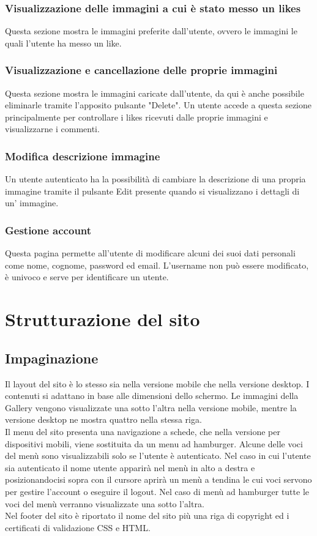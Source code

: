 \documentclass[openany, a4paper, 12pt]{report}
\begin{document}
		\subsubsection{Visualizzazione delle immagini a cui è stato messo un likes}
		Questa sezione mostra le immagini preferite dall'utente, ovvero le immagini le quali l'utente ha messo un like.
		
		\subsubsection{Visualizzazione e cancellazione delle proprie immagini}
		Questa sezione mostra le immagini caricate dall'utente, da qui è anche possibile eliminarle tramite l'apposito pulsante "Delete". Un utente accede a questa sezione principalmente per controllare i likes ricevuti dalle proprie immagini e visualizzarne i commenti.
		
		\subsubsection{Modifica descrizione immagine}
		Un utente autenticato ha la possibilità di cambiare la descrizione di una propria immagine tramite il pulsante Edit presente quando si visualizzano i dettagli di un' immagine.
			
		\subsubsection{Gestione account}
		Questa pagina permette all'utente di modificare alcuni dei suoi dati personali come nome, cognome, password ed email. L'username non può essere modificato, è univoco e serve per identificare un utente.

	\section{Strutturazione del sito}
		\subsection{Impaginazione}
		Il layout del sito è lo stesso sia nella versione mobile che nella versione desktop. I contenuti si adattano in base alle dimensioni dello schermo. Le immagini della Gallery vengono visualizzate una sotto l'altra nella versione mobile, mentre la versione desktop ne mostra quattro nella stessa riga.\\
		Il menu del sito presenta una navigazione a schede, che nella versione per dispositivi mobili, viene sostituita da un menu ad hamburger. Alcune delle voci del menù sono visualizzabili solo se l'utente è autenticato. Nel caso in cui l'utente sia autenticato il nome utente apparirà nel menù in alto a destra e posizionandocisi sopra con il cursore aprirà un menù a tendina le cui voci servono per gestire l'account o eseguire il logout. Nel caso di menù ad hamburger tutte le voci del menù verranno visualizzate una sotto l'altra.\\
		Nel footer del sito è riportato il nome del sito più una riga di copyright ed i certificati di validazione CSS e HTML.
\end{document}
